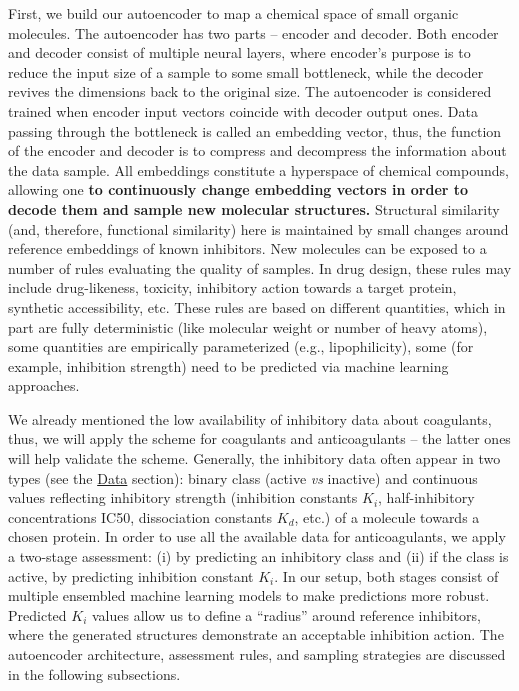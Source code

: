 \documentclass[12pt]{article}
\begin{document}
First, we build our autoencoder to map a chemical space of small organic molecules.
The autoencoder has two parts -- encoder and decoder.
Both encoder and decoder consist of multiple neural layers, where encoder's purpose is to reduce the input size of a sample to some small bottleneck, while the decoder revives the dimensions back to the original size.
The autoencoder is considered trained when encoder input vectors coincide with decoder output ones.
Data passing through the bottleneck is called an embedding vector, thus, the function of the encoder and decoder is to compress and decompress the information about the data sample.
All embeddings constitute a hyperspace of chemical compounds, allowing one \textbf{to continuously change embedding vectors in order to decode them and sample new molecular structures.}
Structural similarity (and, therefore, functional similarity) here is maintained by small changes around reference embeddings of known inhibitors.
New molecules can be exposed to a number of rules evaluating the quality of samples.
In drug design, these rules may include drug-likeness, toxicity, inhibitory action towards a target protein, synthetic accessibility, etc.
These rules are based on different quantities, which in part are fully deterministic (like molecular weight or number of heavy atoms), some quantities are empirically parameterized (e.g., lipophilicity), some (for example, inhibition strength) need to be predicted via machine learning approaches.

We already mentioned the low availability of inhibitory data about coagulants, thus, we will apply the scheme for coagulants and 
anticoagulants -- the latter ones will help validate the scheme.
Generally, the inhibitory data often appear in two types (see the \hyperref[sec:Data]{Data} section): binary class (active \textit{vs} inactive) and continuous values reflecting inhibitory strength  (inhibition constants $K_i$, half-inhibitory concentrations IC50, dissociation constants $K_d$, etc.) of a molecule towards a chosen protein.
In order to use all the available data for anticoagulants, we apply a two-stage assessment: (i) by predicting an inhibitory class and (ii) if the class is active, by predicting inhibition constant $K_i$.
In our setup, both stages consist of multiple ensembled machine learning models to make predictions more robust.~\cite{Druchok2021}
Predicted $K_i$ values allow us to define a ``radius'' around reference inhibitors, where the generated structures demonstrate an acceptable inhibition action.
The autoencoder architecture, assessment rules, and sampling strategies are discussed in the following subsections.
\end{document}
